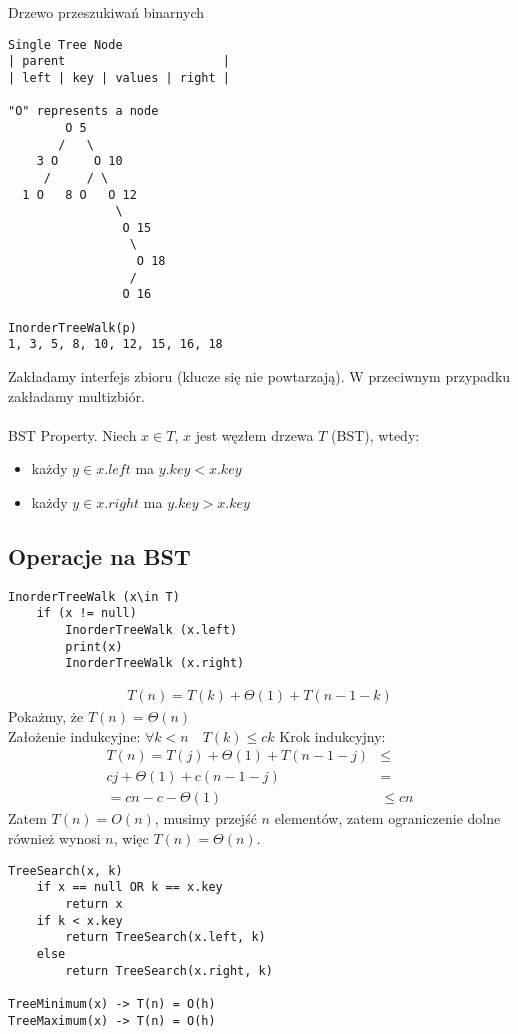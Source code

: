 \documentclass{article}
\numberwithin{equation}{subsection}
\begin{document}
Drzewo przeszukiwań binarnych
\begin{verbatim}
Single Tree Node
| parent                      |
| left | key | values | right |

"O" represents a node
        O 5
       /   \
    3 O     O 10
     /     / \
  1 O   8 O   O 12
               \
                O 15
                 \
                  O 18
                 /
                O 16

InorderTreeWalk(p)
1, 3, 5, 8, 10, 12, 15, 16, 18
\end{verbatim}
Zakładamy interfejs zbioru (klucze się nie powtarzają). W przeciwnym przypadku zakładamy multizbiór.\\\\
\noindent
BST Property. Niech $x\in T$, $x$ jest węzłem drzewa $T$ (BST), wtedy:
\begin{itemize}
    \item każdy $y\in x.left$ ma $y.key < x.key$
    \item każdy $y\in x.right$ ma $y.key > x.key$
\end{itemize}

\subsection{Operacje na BST}

\begin{verbatim}
InorderTreeWalk (x\in T)
    if (x != null) 
        InorderTreeWalk (x.left)
        print(x)
        InorderTreeWalk (x.right)
\end{verbatim}

\begin{align}
    T(n) = T(k) + \Theta(1) + T(n-1-k)
\end{align}
Pokażmy, że $T(n) = \Theta(n)$\\
Założenie indukcyjne: $\forall k<n \quad T(k)\leq ck$
Krok indukcyjny: 
\begin{align}
    T(n) = T(j) + \Theta(1) + T(n-1-j) &\leq\\
    cj + \Theta(1) + c(n-1-j) &=\\
    = cn - c - \Theta(1) &\leq cn
\end{align}
Zatem $T(n) = O(n)$, musimy przejść $n$ elementów,
zatem ograniczenie dolne również wynosi $n$, więc $T(n) = \Theta(n)$.

\begin{verbatim}
TreeSearch(x, k)
    if x == null OR k == x.key
        return x
    if k < x.key
        return TreeSearch(x.left, k)
    else 
        return TreeSearch(x.right, k)

TreeMinimum(x) -> T(n) = O(h)
TreeMaximum(x) -> T(n) = O(h)
\end{verbatim}
\end{document}
